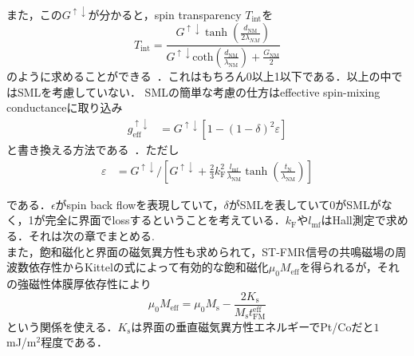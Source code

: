 \documentclass[11pt]{jbook}
\begin{document}
また，この$G^{\uparrow \downarrow}$が分かると，spin transparency $T_\mathrm{int}$を
\begin{equation}
T_{\mathrm{int}}=\frac{G^{\uparrow \downarrow} \tanh \left(\frac{d_{\mathrm{NM}}}{2 \lambda_{NM}}\right)}{G^{\uparrow \downarrow} \mathrm{coth}\left(\frac{d_{\mathrm{NM}}}{\lambda_{\mathrm{NM}}}\right)+\frac{G_{\mathrm{NM}}}{2}}
\end{equation}
のように求めることができる~\cite{Zhang10.1038.nphys3304}．これはもちろん0以上1以下である．以上の中ではSMLを考慮していない．
SMLの簡単な考慮の仕方はeffective spin-mixing conductanceに取り込み
\begin{eqnarray}
g_{\mathrm{eff}}^{\uparrow \downarrow} &=G^{\uparrow \downarrow}\left[1-(1-\delta)^{2} \varepsilon\right]
\end{eqnarray}
と書き換える方法である~\cite{Taoeaat1670}．ただし
\begin{eqnarray}
\varepsilon &=G^{\uparrow \downarrow} /\left[G^{\uparrow \downarrow}+\frac{2}{3} k_{\mathrm{F}}^{2} \frac{l_{\mathrm{mf}}}{\lambda_{\mathrm{NM}}} \tanh \left(\frac{t_{\mathrm{N}}}{\lambda_{\mathrm{NM}}}\right)\right]
\end{eqnarray}

である．$\epsilon$がspin back flowを表現していて，$\delta$がSMLを表していて0がSMLがなく，1が完全に界面でlossするということを考えている．$k_{\mathrm{F}}$や$l_{\mathrm{mf}}$はHall測定で求める．それは次の章でまとめる.\\




また，飽和磁化と界面の磁気異方性も求められて，ST-FMR信号の共鳴磁場の周波数依存性からKittelの式によって有効的な飽和磁化$\mu_{0} M_{\mathrm{eff}}$を得られるが，それの強磁性体膜厚依存性により
\begin{equation}
\mu_{0} M_{\mathrm{eff}}=\mu_{0} M_{\mathrm{s}}-\frac{2 K_{\mathrm{s}}}{M_{\mathrm{s}} t_{\mathrm{FM}}^{\mathrm{eff}}}
\end{equation}
という関係を使える．$K_\mathrm{s}$は界面の垂直磁気異方性エネルギーでPt/Coだと$1$ mJ/m$^2$程度である．
\end{document}
